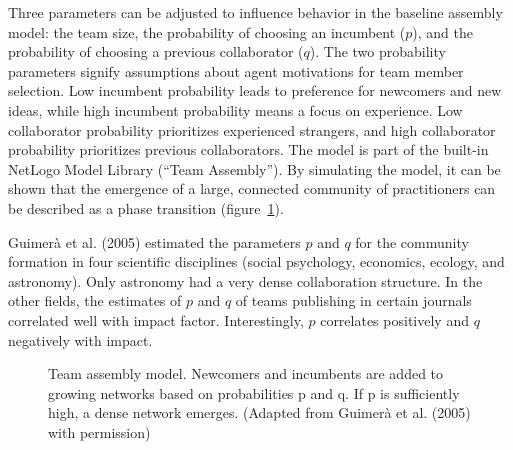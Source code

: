 \documentclass[
  a4paper,
  DIV=11,
  numbers=noendperiod,
  oneside]{scrreprt}
\begin{document}
Three parameters can be adjusted to influence behavior in the baseline
assembly model: the team size, the probability of choosing an incumbent
(\(p\)), and the probability of choosing a previous collaborator
(\(q\)). The two probability parameters signify assumptions about agent
motivations for team member selection. Low incumbent probability leads
to preference for newcomers and new ideas, while high incumbent
probability means a focus on experience. Low collaborator probability
prioritizes experienced strangers, and high collaborator probability
prioritizes previous collaborators. The model is part of the built-in
NetLogo Model Library (``Team Assembly''). By simulating the model, it
can be shown that the emergence of a large, connected community of
practitioners can be described as a phase transition
(figure~\ref{fig-ch5n-img10-old-48}).

Guimerà et al. (2005) estimated the parameters \(p\) and \(q\) for the
community formation in four scientific disciplines (social psychology,
economics, ecology, and astronomy). Only astronomy had a very dense
collaboration structure. In the other fields, the estimates of \(p\) and
\(q\) of teams publishing in certain journals correlated well with
impact factor. Interestingly, \(p\) correlates positively and \(q\)
negatively with impact.

\begin{figure}


\caption{\label{fig-ch5n-img10-old-48}Team assembly model. Newcomers and
incumbents are added to growing networks based on probabilities p and q.
If p is sufficiently high, a dense network emerges. (Adapted from
Guimerà et al. (2005) with permission)}

\end{figure}%
\end{document}
